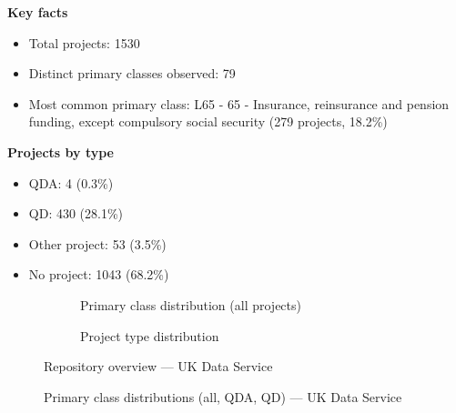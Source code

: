 \textbf{Key facts}

\begin{itemize}
    \item Total projects: 1530
    \item Distinct primary classes observed: 79
    \item Most common primary class: L65 - 65 - Insurance, reinsurance and pension funding, except compulsory social security (279 projects, 18.2\%)
\end{itemize}

\textbf{Projects by type}

\begin{itemize}
    \item QDA: 4 (0.3\%)
    \item QD: 430 (28.1\%)
    \item Other project: 53 (3.5\%)
    \item No project: 1043 (68.2\%)
\end{itemize}

\begin{figure}[H]
    \centering
    \begin{subfigure}[t]{0.49\textwidth}
        \centering
        
        \caption{Primary class distribution (all projects)}
    \end{subfigure}
    \hfill
    \begin{subfigure}[t]{0.49\textwidth}
        \centering
        
        \caption{Project type distribution}
    \end{subfigure}
    \caption{Repository overview --- UK Data Service}
\end{figure}

\clearpage

\begin{figure}[H]
    \centering
    
    \par\vspace{0.8em}
    
    \par\vspace{0.8em}
    
    \caption{Primary class distributions (all, QDA, QD) --- UK Data Service}
\end{figure}

